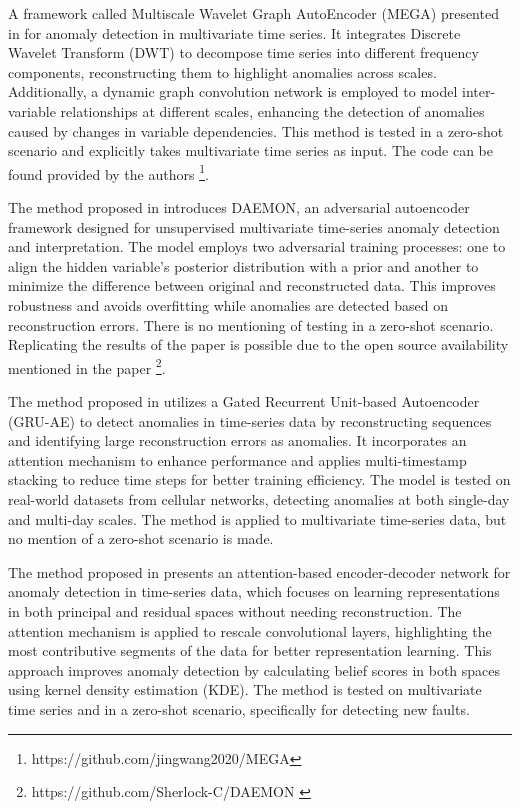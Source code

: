 A framework called Multiscale Wavelet Graph AutoEncoder (MEGA) presented in \cite{wang_multiscale_2023} for anomaly detection in multivariate time series. It integrates Discrete Wavelet Transform (DWT) to decompose time series into different frequency components, reconstructing them to highlight anomalies across scales. Additionally, a dynamic graph convolution network is employed to model inter-variable relationships at different scales, enhancing the detection of anomalies caused by changes in variable dependencies.
This method is tested in a zero-shot scenario and explicitly takes multivariate time series as input. The code can be found provided by the authors \footnote{\fussy\tiny https://github.com/jingwang2020/MEGA}.

The method proposed in \cite{chen_adversarial_2023} introduces DAEMON, an adversarial autoencoder framework designed for unsupervised multivariate time-series anomaly detection and interpretation. The model employs two adversarial training processes: one to align the hidden variable’s posterior distribution with a prior and another to minimize the difference between original and reconstructed data. This improves robustness and avoids overfitting while anomalies are detected based on reconstruction errors. There is no mentioning of testing in a zero-shot scenario.
Replicating the results of the paper is possible due to the open source availability mentioned in the paper
\footnote{\fussy\tiny https://github.com/Sherlock-C/DAEMON \label{foot_daemon}}.


The method proposed in \cite{gong_autoencoder-based_2022} utilizes a Gated Recurrent Unit-based Autoencoder (GRU-AE) to detect anomalies in time-series data by reconstructing sequences and identifying large reconstruction errors as anomalies. It incorporates an attention mechanism to enhance performance and applies multi-timestamp stacking to reduce time steps for better training efficiency. The model is tested on real-world datasets from cellular networks, detecting anomalies at both single-day and multi-day scales. The method is applied to multivariate time-series data, but no mention of a zero-shot scenario is made.

%
The method proposed in \cite{wang_attention-based_2022} presents an attention-based encoder-decoder network for anomaly detection in time-series data, which focuses on learning representations in both principal and residual spaces without needing reconstruction. The attention mechanism is applied to rescale convolutional layers, highlighting the most contributive segments of the data for better representation learning. This approach improves anomaly detection by calculating belief scores in both spaces using kernel density estimation (KDE). The method is tested on multivariate time series and in a zero-shot scenario, specifically for detecting new faults.

